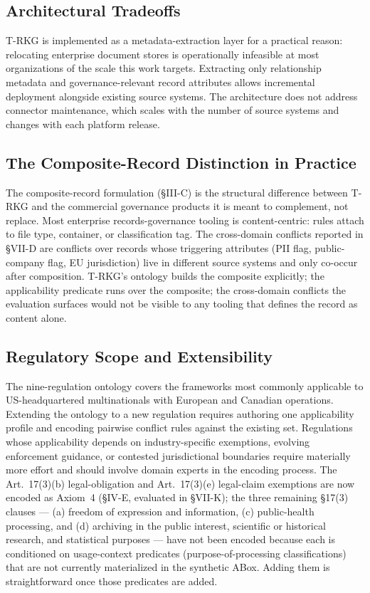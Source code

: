 \documentclass{ieeeaccess}
\begin{document}
\subsection{Architectural Tradeoffs}

T-RKG is implemented as a metadata-extraction layer for a practical reason: relocating enterprise document stores is operationally infeasible at most organizations of the scale this work targets. Extracting only relationship metadata and governance-relevant record attributes allows incremental deployment alongside existing source systems. The architecture does not address connector maintenance, which scales with the number of source systems and changes with each platform release.

\subsection{The Composite-Record Distinction in Practice}

The composite-record formulation (§III-C) is the structural difference between T-RKG and the commercial governance products it is meant to complement, not replace. Most enterprise records-governance tooling is content-centric: rules attach to file type, container, or classification tag. The cross-domain conflicts reported in §VII-D are conflicts over records whose triggering attributes (PII flag, public-company flag, EU jurisdiction) live in different source systems and only co-occur after composition. T-RKG's ontology builds the composite explicitly; the applicability predicate runs over the composite; the cross-domain conflicts the evaluation surfaces would not be visible to any tooling that defines the record as content alone.

\subsection{Regulatory Scope and Extensibility}

The nine-regulation ontology covers the frameworks most commonly applicable to US-headquartered multinationals with European and Canadian operations. Extending the ontology to a new regulation requires authoring one applicability profile and encoding pairwise conflict rules against the existing set. Regulations whose applicability depends on industry-specific exemptions, evolving enforcement guidance, or contested jurisdictional boundaries require materially more effort and should involve domain experts in the encoding process. The Art.~17(3)(b) legal-obligation and Art.~17(3)(e) legal-claim exemptions are now encoded as Axiom~4 (§IV-E, evaluated in §VII-K); the three remaining §17(3) clauses --- (a) freedom of expression and information, (c) public-health processing, and (d) archiving in the public interest, scientific or historical research, and statistical purposes --- have not been encoded because each is conditioned on usage-context predicates (purpose-of-processing classifications) that are not currently materialized in the synthetic ABox. Adding them is straightforward once those predicates are added.
\end{document}
